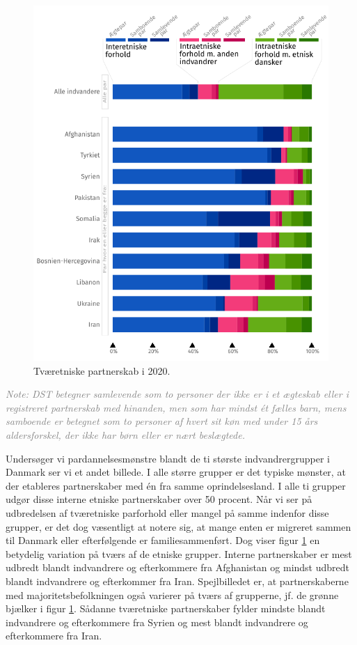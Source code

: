 \documentclass[
]{book}
\begin{document}
\begin{figure}
\includegraphics[width=1\linewidth]{images/figur_intergruppepartnerskaber_2020} \caption{Tværetniske partnerskab i 2020.}\label{fig:fig-2-2}
\end{figure}

\begin{footnotesize}\textit{\textcolor{gray}{
Note: DST betegner samlevende som to personer der ikke er i et ægteskab eller i registreret partnerskab med hinanden, men som har mindst ét fælles barn, mens samboende er betegnet som to personer af hvert sit køn med under 15 års aldersforskel, der ikke har børn eller er nært beslægtede.
}}
\end{footnotesize}

Undersøger vi pardannelsesmønstre blandt de ti største indvandrergrupper i Danmark ser vi et andet billede. I alle større grupper er det typiske mønster, at der etableres partnerskaber med én fra samme oprindelsesland. I alle ti grupper udgør disse interne etniske partnerskaber over 50 procent. Når vi ser på udbredelsen af tværetniske parforhold eller mangel på samme indenfor disse grupper, er det dog væsentligt at notere sig, at mange enten er migreret sammen til Danmark eller efterfølgende er familiesammenført. Dog viser figur \ref{fig:fig-2-2} en betydelig variation på tværs af de etniske grupper. Interne partnerskaber er mest udbredt blandt indvandrere og efterkommere fra Afghanistan og mindst udbredt blandt indvandrere og efterkommer fra Iran. Spejlbilledet er, at partnerskaberne med majoritetsbefolkningen også varierer på tværs af grupperne, jf. de grønne bjælker i figur \ref{fig:fig-2-2}. Sådanne tværetniske partnerskaber fylder mindste blandt indvandrere og efterkommere fra Syrien og mest blandt indvandrere og efterkommere fra Iran.
\end{document}

